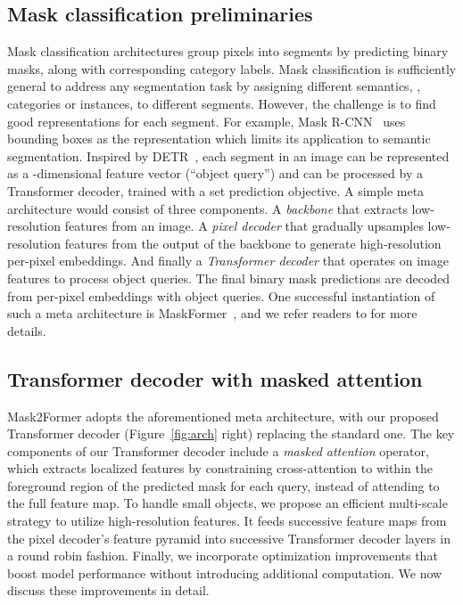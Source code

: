 \documentclass[10pt,twocolumn,letterpaper]{article}
\newcommand{\modelname}{Mask2Former\xspace}
\newcommand{\figref}[1]{Figure~\ref{#1}}
\begin{document}
\subsection{Mask classification preliminaries}
Mask classification architectures group pixels into  segments by predicting  binary masks, along with  corresponding category labels. Mask classification is sufficiently general to address any segmentation task by assigning different semantics, \eg, categories or instances, to different segments. However, the challenge is to find good representations for each segment. For example, Mask R-CNN~\cite{he2017mask} uses bounding boxes as the representation which limits its application to semantic segmentation.
Inspired by DETR~\cite{detr}, each segment in an image can be represented as a -dimensional feature vector (``object query'') and can be processed by a Transformer decoder, trained with a set prediction objective.
A simple meta architecture would consist of three components.
A \emph{backbone} that extracts low-resolution features from an image. A \emph{pixel decoder} that gradually upsamples low-resolution features from the output of the backbone to generate high-resolution per-pixel embeddings. And finally a \emph{Transformer decoder} that operates on image features to process object queries. The final binary mask predictions are decoded from per-pixel embeddings with object queries. One successful instantiation of such a meta architecture is MaskFormer~\cite{cheng2021maskformer}, and we refer readers to \cite{cheng2021maskformer} for more details.


\subsection{Transformer decoder with masked attention}
\label{sec:method:arch:transformer_decoder}

\modelname adopts the aforementioned meta architecture, with our proposed Transformer decoder (\figref{fig:arch} right) replacing the standard one. The key components of our Transformer decoder include a \emph{masked attention} operator, which extracts  localized features by constraining cross-attention to within the foreground region of the predicted mask for each query, instead of
attending to the full feature map.
To handle small objects, we propose an efficient multi-scale strategy to utilize high-resolution features.
It feeds successive feature maps from the pixel decoder's feature pyramid into successive Transformer decoder layers in a round robin fashion.
Finally, we incorporate optimization improvements that boost model performance without introducing additional computation.
We now discuss these improvements in detail.
\end{document}
